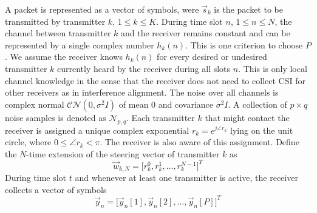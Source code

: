 \documentclass[10pt, a4paper, twocolumn]{IEEEtran}
\begin{document}
\noindent A packet is represented as a vector of symbols, were $\overrightarrow{s}_k$ is the packet to be transmitted by transmitter $k$, $1\leq k\leq K$. During time slot $n$, $1\leq n\leq N$, the channel between transmitter $k$ and the receiver remains constant and can be represented by a single complex number $h_k(n)$. This is one criterion to choose $P$. We assume the receiver knows $h_k(n)$ for every desired or undesired transmitter $k$ currently heard by the receiver during all slots $n$. This is only local channel knowledge in the sense that the receiver does not need to collect CSI for other receivers as in interference alignment. The noise over all channels is complex normal $\mathcal{CN}(0,\sigma^2 I)$ of mean 0 and covariance $\sigma^2 I$. A collection of $p\times q$ noise samples is denoted as $\mathcal{N}_{p,q}$. Each transmitter $k$ that might contact the receiver is assigned a unique complex exponential $r_k = e^{j\angle r_k}$ lying on the unit circle, where $0\leq \angle r_k < \pi$. The receiver is also aware of this assignment. Define the $N$-time extension of the steering vector of transmitter $k$ as
\begin{equation}
\overrightarrow{w}_{k,N} = \big[r_k^0, r_k^1,\dots, r_k^{N-1}\big]^T
\end{equation}
\noindent During time slot $t$ and whenever at least one transmitter is active, the receiver collects a vector of symbols
\begin{equation}
\overrightarrow{y}_n = \big[\overrightarrow{y}_n[1], \overrightarrow{y}_n[2],\dots, \overrightarrow{y}_n[P]\big]^T
\end{equation} 
\end{document}

